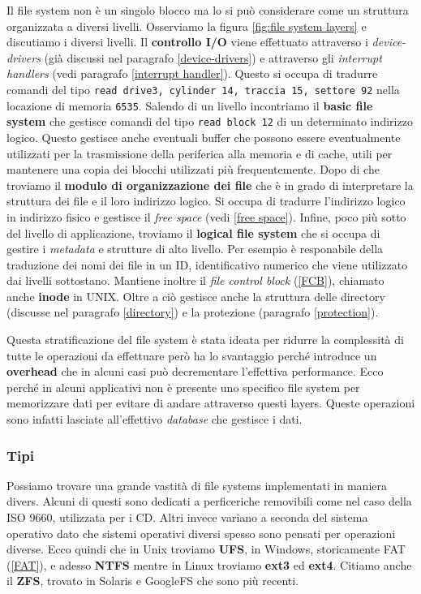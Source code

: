 Il file system non è un singolo blocco ma lo si può considerare come un struttura organizzata a diversi livelli. Osserviamo la figura \ref{fig:file system layers} e discutiamo i diversi livelli.
Il \textbf{controllo I/O} viene effettuato attraverso i \textit{device-drivers} (già discussi nel paragrafo \ref{device-drivers}) e attraverso gli \textit{interrupt handlers} (vedi paragrafo \ref{interrupt handler}). Questo si occupa di tradurre comandi del tipo \texttt{read drive3, cylinder 14, traccia 15, settore 92} nella locazione di memoria \texttt{6535}. Salendo di un livello incontriamo il \textbf{basic file system} che gestisce comandi del tipo \texttt{read block 12} di un determinato indirizzo logico. Questo gestisce anche eventuali buffer che possono essere eventualmente utilizzati per la trasmissione della periferica alla memoria e di cache, utili per mantenere una copia dei blocchi utilizzati più frequentemente. Dopo di che troviamo il \textbf{modulo di organizzazione dei file} che è in grado di interpretare la struttura dei file e il loro indirizzo logico. Si occupa di tradurre l'indirizzo logico in indirizzo fisico e gestisce il \textit{free space} (vedi \ref{free space}). Infine, poco più sotto del livello di applicazione, troviamo il \textbf{logical file system} che si occupa di gestire i \textit{metadata} e strutture di alto livello. Per esempio è responabile della traduzione dei nomi dei file in un ID, identificativo numerico che viene utilizzato dai livelli sottostano. Mantiene inoltre il \textit{file control block} (\ref{FCB}), chiamato anche \textbf{inode} in UNIX. Oltre a ciò gestisce anche la struttura delle directory (discusse nel paragrafo \ref{directory}) e la protezione (paragrafo \ref{protection}).

Questa stratificazione del file system è stata ideata per ridurre la complessità di tutte le operazioni da effettuare però ha lo svantaggio perché introduce un \textbf{overhead} che in alcuni casi può decrementare l'effettiva performance. Ecco perché in alcuni applicativi non è presente uno specifico file system per memorizzare dati per evitare di andare attraverso questi layers. Queste operazioni sono infatti lasciate all'effettivo \textit{database} che gestisce i dati.

% 
\subsubsection*{Tipi}
Possiamo trovare una grande vastità di file systems implementati in maniera divers. Alcuni di questi sono dedicati a perficeriche removibili come nel caso della ISO 9660, utilizzata per i CD. Altri invece variano a seconda del sistema operativo dato che sistemi operativi diversi spesso sono pensati per operazioni diverse. Ecco quindi che in Unix troviamo \textbf{UFS}, in Windows, storicamente FAT (\ref{FAT}), e adesso \textbf{NTFS} mentre in Linux troviamo \textbf{ext3} ed \textbf{ext4}. Citiamo anche il \textbf{ZFS}, trovato in Solaris e GoogleFS che sono più recenti.

